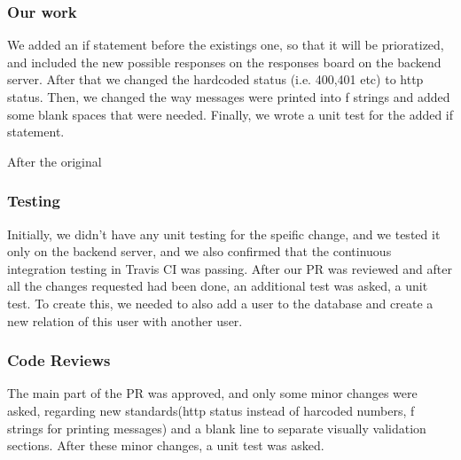 \documentclass{article}
\begin{document}
\subsubsection{Our work}

We added an if statement before the existings one, so that it will be prioratized, and included the new possible responses on the responses board on the backend server. After that we changed the hardcoded status (i.e. 400,401 etc) to http status. Then, we changed the way messages were printed into f strings and added some blank spaces that were needed. Finally, we wrote a unit test for the added if statement.

After the original 
\subsubsection{Testing}
Initially, we didn't have any unit testing for the speific change, and we tested it only on the backend server, and we also confirmed that the continuous integration testing in Travis CI was passing. 
After our PR was reviewed and after all the changes requested had been done, an additional test was asked, a unit test. To create this, we needed to also add a user to the database and create a new relation of this user with another user.

\subsubsection{Code Reviews}
The main part of the PR was approved, and only some minor changes were asked, regarding new standards(http status instead of harcoded numbers, f strings for printing messages) and a blank line to separate visually validation sections. After these minor changes, a unit test was asked.
\end{document}
